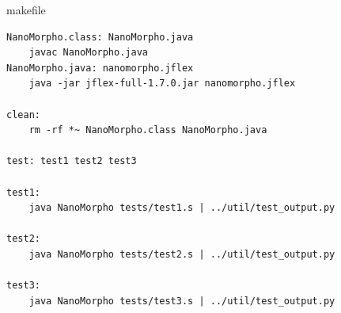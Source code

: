 \documentclass{homework}
\begin{document}
\newpage

\begin{question}{makefile}
  
\end{question}
\begin{answer}
  \begin{verbatim}
NanoMorpho.class: NanoMorpho.java
	javac NanoMorpho.java
NanoMorpho.java: nanomorpho.jflex
	java -jar jflex-full-1.7.0.jar nanomorpho.jflex

clean:
	rm -rf *~ NanoMorpho.class NanoMorpho.java

test: test1 test2 test3

test1:
	java NanoMorpho tests/test1.s | ../util/test_output.py

test2:
	java NanoMorpho tests/test2.s | ../util/test_output.py

test3:
	java NanoMorpho tests/test3.s | ../util/test_output.py
  \end{verbatim}
\end{answer}

\newpage
\end{document}

